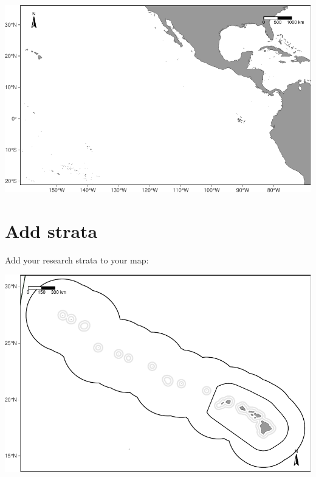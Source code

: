 \documentclass[
]{book}
\newenvironment{Shaded}{\begin{snugshade}}{\end{snugshade}}
\newcommand{\DataTypeTok}[1]{\textcolor[rgb]{0.13,0.29,0.53}{#1}}
\newcommand{\KeywordTok}[1]{\textcolor[rgb]{0.13,0.29,0.53}{\textbf{#1}}}
\newcommand{\NormalTok}[1]{#1}
\newcommand{\OperatorTok}[1]{\textcolor[rgb]{0.81,0.36,0.00}{\textbf{#1}}}
\newcommand{\StringTok}[1]{\textcolor[rgb]{0.31,0.60,0.02}{#1}}
\begin{document}
\includegraphics{figures/unnamed-chunk-56-1.pdf}

\hypertarget{add-strata}{%
\section*{Add strata}\label{add-strata}}

Add your research strata to your map:

\begin{Shaded}
\end{Shaded}

\includegraphics{figures/unnamed-chunk-57-1.pdf}
\end{document}

